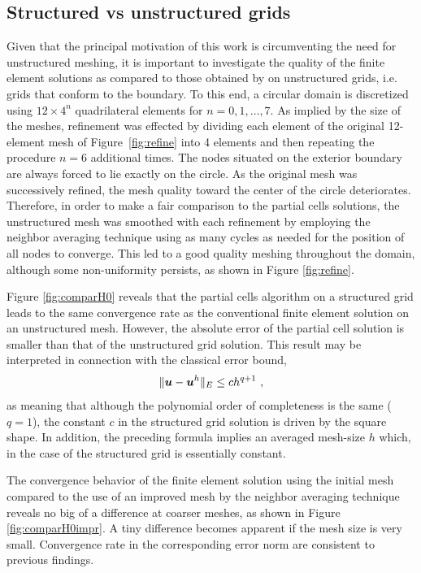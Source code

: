 \documentclass[12pt,twoside]{article}
\newcommand{\mb}[1]{{\mbox{\boldmath$#1$\unboldmath}}}
\begin{document}
\subsection{Structured vs unstructured grids}\label{sec:svsu}
\par 
Given that the principal motivation of this work is circumventing the
need for unstructured meshing, it is important to investigate the
quality of the finite element solutions as compared to those obtained by 
on unstructured grids, i.e. grids that conform to the boundary.
To this end, a circular domain is discretized using $12\times 4^n$
quadrilateral elements for $n=0,1,\ldots,7$. As implied by the size of
the meshes, refinement was effected by dividing each element of the
original 12-element mesh of Figure~\ref{fig:refine} into 4 elements and 
then repeating the procedure $n=6$ additional times. 
The nodes situated on the exterior
boundary are always forced to lie exactly on the circle.
As the original mesh was successively refined, the mesh quality 
toward the center of the circle deteriorates. Therefore, in order to 
make a fair comparison to the partial cells solutions, the unstructured mesh 
was smoothed with each refinement by employing the neighbor averaging 
technique using as many cycles as needed for the position of all nodes
to converge. This led to a good quality meshing throughout the domain,
although some non-uniformity persists, as shown in Figure \ref{fig:refine}. 
\par
Figure \ref{fig:comparH0} reveals that the partial 
cells algorithm on a structured grid leads to the same convergence rate as 
the conventional finite element solution on an unstructured mesh. 
However, the absolute error of the partial cell solution is smaller
than that of the unstructured grid solution. This result may be
interpreted in connection with the classical error bound,
%
\begin{equation}\label{eqn:energynormineq}
 \Vert \mb{u} - \mb{u}^h \Vert _E \leq c h^{q+1}\ ,
\end{equation}
%
as meaning that although the polynomial order of completeness is the
same ($q=1$), the constant $c$ in the structured grid solution is
driven by the square shape. In addition, the preceding formula implies
an averaged mesh-size $h$ which, in the case of the structured grid is
essentially constant. 
\par
The convergence behavior of the finite element solution using the initial mesh compared to the use of an improved mesh by the neighbor averaging technique reveals no big of a difference at coarser meshes, as shown in Figure \ref{fig:comparH0impr}. A tiny difference becomes apparent if the mesh size is very small. Convergence rate in the corresponding error norm are consistent to previous findings.
\end{document}
